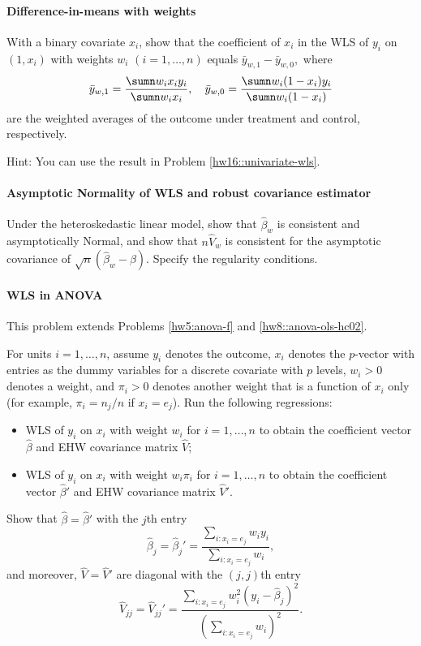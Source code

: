\paragraph{Difference-in-means with weights}\label{hw16::binaryx-wls}

With a binary covariate $x_i$, show that the coefficient of $x_i$ in the WLS of $y_i$ on $(1,x_i)$ with weights $w_i$ $(i=1,\ldots, n)$ equals 
$
\bar{y}_{w,1} - \bar{y}_{w,0},
$
where
$$
\bar{y}_{w,1}   =  \frac{ \sumn w_i x_i y_i  }{ \sumn w_i x_i } ,\quad
\bar{y}_{w,0} =  \frac{ \sumn w_i (1-x_i) y_i  }{ \sumn w_i (1-x_i) }
$$
are the weighted averages of the outcome under treatment and control, respectively. 

Hint: You can use the result in Problem \ref{hw16::univariate-wls}. 

\paragraph{Asymptotic Normality of WLS and robust covariance estimator}

Under the heteroskedastic linear model,  show that $\hat{\beta}_{w}$ is consistent and asymptotically Normal,
and show that $n\hat{V}_{w}$ is consistent for the asymptotic covariance
of $\sqrt{n}(\hat{\beta}_{w}-\beta).$ Specify the regularity conditions. 



\paragraph{WLS in ANOVA}\label{hw16::wls-anova}

This problem extends Problems \ref{hw5:anova-f}  and \ref{hw8::anova-ols-hc02}. 

For units $i=1,\ldots, n$, assume $y_i$ denotes the outcome, $x_i$ denotes the $p$-vector with entries as the dummy variables for a discrete covariate with $p$ levels, $w_i > 0$ denotes a weight, and $\pi_i > 0$ denotes another weight that is a function of $x_i$ only (for example, $\pi_i = n_j/n$ if $x_i = e_j$). Run the following regressions:
\begin{itemize}
\item
WLS of $y_i$ on $x_i$ with weight $w_i$ for $i=1,\ldots, n$ to obtain the coefficient vector $\hat{\beta}$ and EHW covariance matrix $\hat{V}$;
\item
WLS of $y_i$ on $x_i$ with weight $w_i \pi_i$ for $i=1,\ldots, n$ to obtain the coefficient vector $\hat{\beta}'$ and EHW covariance matrix $\hat{V}'$.
\end{itemize}
Show that 
$
\hat{\beta} = \hat{\beta}'  
$ 
with the $j$th entry
$$
\hat\beta_j=\hat\beta_j' = \frac{  \sum_{i: x_i = e_j}  w_i y_i }{  \sum_{i: x_i = e_j}  w_i},
$$
and moreover, $\hat{V} = \hat{V}'$ are diagonal with the $(j,j)$th entry
$$
\hat{V}_{jj} = \hat{V}_{jj}' = \frac{\sum_{i: x_i = e_j}  w_i^2 (y_i - \hat\beta_j)^2 }{ ( \sum_{i: x_i = e_j}  w_i   )^2  }  .
$$

